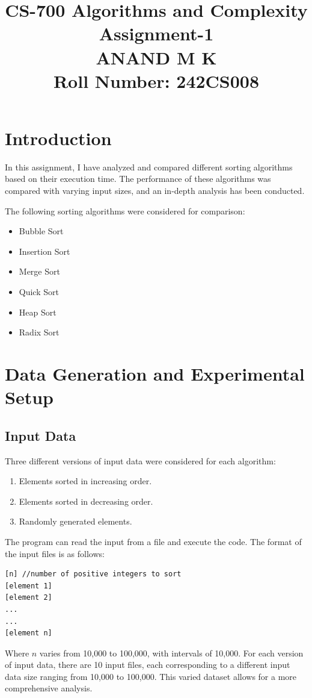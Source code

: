 \documentclass[a4paper,12pt]{report}
\title{
  \vspace{-2em} %
  \textbf{CS-700 Algorithms and Complexity} \\ %
  \large \textbf{Assignment-1} \\ %
  \vspace{1em} %
  \textbf{ANAND M K} \\ %
  Roll Number: 242CS008 %
}
\date{} %
\begin{document}
\maketitle

\section{Introduction}
In this assignment, I have analyzed and compared different sorting algorithms based on their execution time. The performance of these algorithms was compared with varying input sizes, and an in-depth analysis has been conducted.

The following sorting algorithms were considered for comparison:
\begin{itemize}
  \item Bubble Sort
  \item Insertion Sort
  \item Merge Sort
  \item Quick Sort
  \item Heap Sort
  \item Radix Sort
\end{itemize}

\section{Data Generation and Experimental Setup}
\subsection{Input Data}
Three different versions of input data were considered for each algorithm:
\begin{enumerate}
  \item Elements sorted in increasing order.
  \item Elements sorted in decreasing order.
  \item Randomly generated elements.
\end{enumerate}

The program can read the input from a file and execute the code. The format of the input files is as follows:
\begin{verbatim}
[n] //number of positive integers to sort
[element 1]
[element 2]
...
...
[element n]
\end{verbatim}

Where \( n \) varies from 10,000 to 100,000, with intervals of 10,000. For each version of input data, there are 10 input files, each corresponding to a different input data size ranging from 10,000 to 100,000. This varied dataset allows for a more comprehensive analysis.
\end{document}

